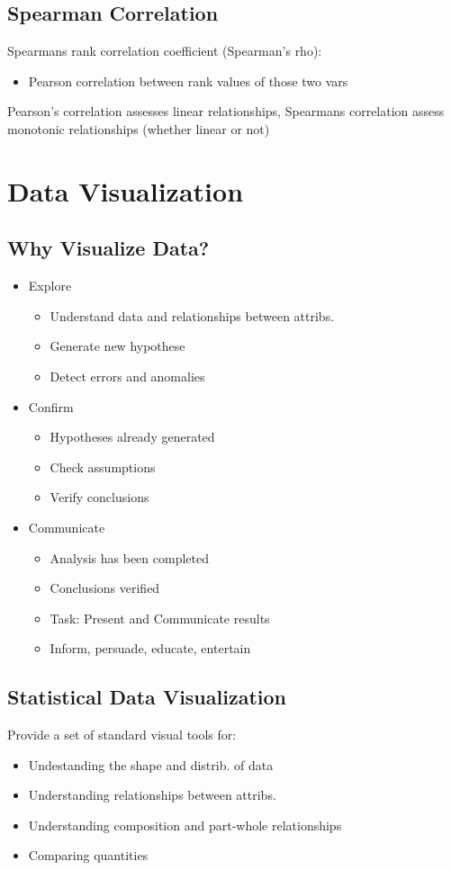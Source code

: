 \documentclass[a4paper]{article}
\begin{document}
\subsection{Spearman Correlation}
Spearmans rank correlation coefficient (Spearman's rho):
\begin{itemize}
	\item Pearson correlation between rank values of those two vars
\end{itemize}
\par Pearson's correlation assesses linear relationships, Spearmans correlation
assess monotonic relationships (whether linear or not)
\section{Data Visualization}
\subsection{Why Visualize Data?}
\begin{itemize}
	\item Explore
	\begin{itemize}
		\item Understand data and relationships between attribs.
		\item Generate new hypothese
		\item Detect errors and anomalies
	\end{itemize}
	\item Confirm
	\begin{itemize}
		\item Hypotheses already generated
		\item Check assumptions
		\item Verify conclusions
	\end{itemize}
	\item Communicate
	\begin{itemize}
		\item Analysis has been completed
		\item Conclusions verified
		\item Task: Present and Communicate results
		\item Inform, persuade, educate, entertain
	\end{itemize}
\end{itemize}
\subsection{Statistical Data Visualization}
Provide a set of standard visual tools for:
\begin{itemize}
	\item Undestanding the shape and distrib. of data
	\item Understanding relationships between attribs.
	\item Understanding composition and part-whole relationships
	\item Comparing quantities
\end{itemize}
\end{document}
